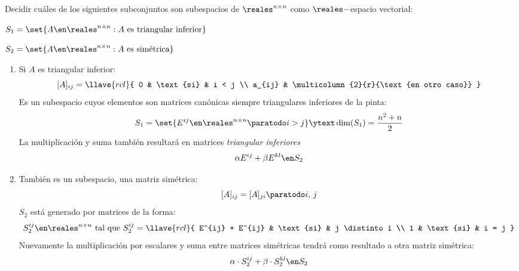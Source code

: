 \begin{enunciado}{\ejercicio}
  Decidir cuáles de los siguientes subconjuntos son subespacios de $\reales^{n \times n}$ como $\reales-$espacio
  vectorial:
  \begin{enumerate}[label=(\alph*)]
    \begin{multicols}{2}
      \item $S_1 = \set{A \en \reales^{n \times n} : A \text{ es triangular inferior}}$
      \item $S_2 = \set{A \en \reales^{n \times n} : A \text{ es simétrica}}$
    \end{multicols}
  \end{enumerate}
\end{enunciado}

\begin{enumerate}[label=(\alph*)]
  \item Si $A$ es triangular inferior:
        $$
          [A]_{ij} =
          \llave{rcl}{
            0 & \text{si} & i < j \\
            a_{ij} & \multicolumn{2}{r}{\text{en otro caso}}
          }
        $$
        Es un subespacio cuyos elementos son matrices canónicas siempre triangulares inferiores de la pinta:
        $$
          S_1 = \set{E^{ij} \en \reales^{n \times n} \paratodo i > j} \ytext \dim(S_1) = \frac{n^2 + n}{2}
        $$
        La multiplicación y suma también resultará en matrices \textit{triangular inferiores}
        $$
          \alpha E^{ij} + \beta E^{kl} \en S_2
        $$

  \item También es un subespacio, una matriz simétrica:
        $$
          [A]_{ij} = [A]_{ji}  \paratodo i,\,j
        $$
        $S_2$ está generado por matrices de la forma:
        $$
          S_2^{ij} \en \reales^{n \times n}
          \text{ tal que }
          S_2^{ij} =
          \llave{rcl}{
            E^{ij} + E^{ij} & \text{si} & j \distinto i \\
            1 & \text{si} & i = j
          }
        $$
        Nuevamente la multiplicación por escalares y suma entre matrices simétricas tendrá como resultado a otra matriz simétrica:
        $$
          \alpha \cdot S_2^{ij} + \beta \cdot S_2^{kl} \en S_2
        $$
\end{enumerate}

\begin{aportes}
  \item {}
\end{aportes}
